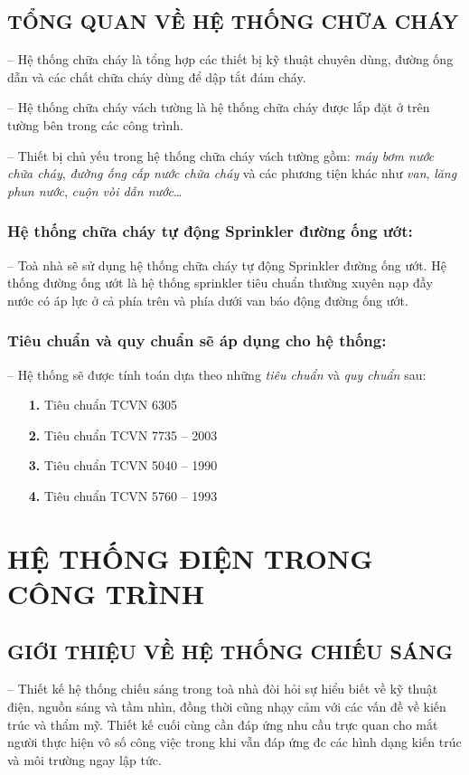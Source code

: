 	\subsection{TỔNG QUAN VỀ HỆ THỐNG CHỮA CHÁY}	
	-- Hệ thống chữa cháy là tổng hợp các thiết bị kỹ thuật chuyên dùng, đường ống dẫn và các chất chữa cháy dùng để dập tắt đám cháy.
	
	-- Hệ thống chữa cháy vách tường là hệ thống chữa cháy được lắp đặt ở trên tường bên trong các công trình.
	
	-- Thiết bị chủ yếu trong hệ thống chữa cháy vách tường gồm: \emph{máy bơm nước chữa cháy}, \emph{đường ống cấp nước chữa cháy} và các phương tiện khác như \emph{van}, \emph{lăng phun nước}, \emph{cuộn vòi dẫn nước}…
	
	\subsubsection{Hệ thống chữa cháy tự động Sprinkler đường ống ướt:}
	-- Toà nhà sẽ sử dụng hệ thống chữa cháy tự động Sprinkler đường ống ướt. Hệ thống đường ống ướt là hệ thống sprinkler tiêu chuẩn thường xuyên nạp đầy nước có áp lực ở cả phía trên và phía dưới van báo động đường ống ướt.
	\subsubsection{Tiêu chuẩn và quy chuẩn sẽ áp dụng cho hệ thống:}
	-- Hệ thống sẽ được tính toán dựa theo những \emph{tiêu chuẩn} và \emph{quy chuẩn} sau:
	\begin{itemize}
		\item[\textbf{1.}]Tiêu chuẩn TCVN 6305 
		\item[\textbf{2.}]Tiêu chuẩn TCVN 7735 – 2003
		\item[\textbf{3.}]Tiêu chuẩn TCVN 5040 – 1990
		\item[\textbf{4.}]Tiêu chuẩn TCVN 5760 – 1993
	\end{itemize}

	\section{HỆ THỐNG ĐIỆN TRONG CÔNG TRÌNH}
	\subsection{GIỚI THIỆU VỀ HỆ THỐNG CHIẾU SÁNG}	
	-- Thiết kế hệ thống chiếu sáng trong toà nhà đòi hỏi sự hiểu biết về kỹ thuật điện, nguồn sáng và tầm nhìn, đồng thời cũng nhạy cảm với các vấn đề về kiến trúc và thẩm mỹ. Thiết kế cuối cùng cần đáp ứng nhu cầu trực quan cho mắt người thực hiện vô số công việc trong khi vẫn đáp ứng đc các hình dạng kiến trúc và môi trường ngay lập tức.
	
